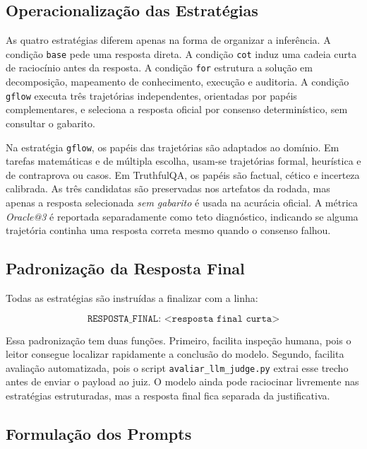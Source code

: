 \documentclass[12pt]{article}
\makeatletter
\newcommand{\oracle}{\mbox{\textit{Oracle@3}}}
\makeatother
\begin{document}
\subsection{Operacionaliza\c{c}\~ao das Estrat\'egias}

As quatro estrat\'egias diferem apenas na forma de organizar a infer\^encia. A condi\c{c}\~ao \texttt{base} pede uma resposta direta. A condi\c{c}\~ao \texttt{cot} induz uma cadeia curta de racioc\'inio antes da resposta. A condi\c{c}\~ao \texttt{for} estrutura a solu\c{c}\~ao em decomposi\c{c}\~ao, mapeamento de conhecimento, execu\c{c}\~ao e auditoria. A condi\c{c}\~ao \texttt{gflow} executa tr\^es trajet\'orias independentes, orientadas por pap\'eis complementares, e seleciona a resposta oficial por consenso determin\'istico, sem consultar o gabarito.

Na estrat\'egia \texttt{gflow}, os pap\'eis das trajet\'orias s\~ao adaptados ao dom\'inio. Em tarefas matem\'aticas e de m\'ultipla escolha, usam-se trajet\'orias formal, heur\'istica e de contraprova ou casos. Em TruthfulQA, os pap\'eis s\~ao factual, c\'etico e incerteza calibrada. As tr\^es candidatas s\~ao preservadas nos artefatos da rodada, mas apenas a resposta selecionada \textit{sem gabarito} \'{e} usada na acur\'acia oficial. A m\'etrica \oracle{} \'{e} reportada separadamente como teto diagn\'ostico, indicando se alguma trajet\'oria continha uma resposta correta mesmo quando o consenso falhou.

\subsection{Padronização da Resposta Final}

Todas as estratégias são instruídas a finalizar com a linha:

\[
\texttt{RESPOSTA\_FINAL: <resposta final curta>}
\]

Essa padronização tem duas funções. Primeiro, facilita inspeção humana, pois o leitor consegue localizar rapidamente a conclusão do modelo. Segundo, facilita avaliação automatizada, pois o script \texttt{avaliar\_llm\_judge.py} extrai esse trecho antes de enviar o payload ao juiz. O modelo ainda pode raciocinar livremente nas estratégias estruturadas, mas a resposta final fica separada da justificativa.


\subsection{Formula\c{c}\~ao dos Prompts}
\end{document}
